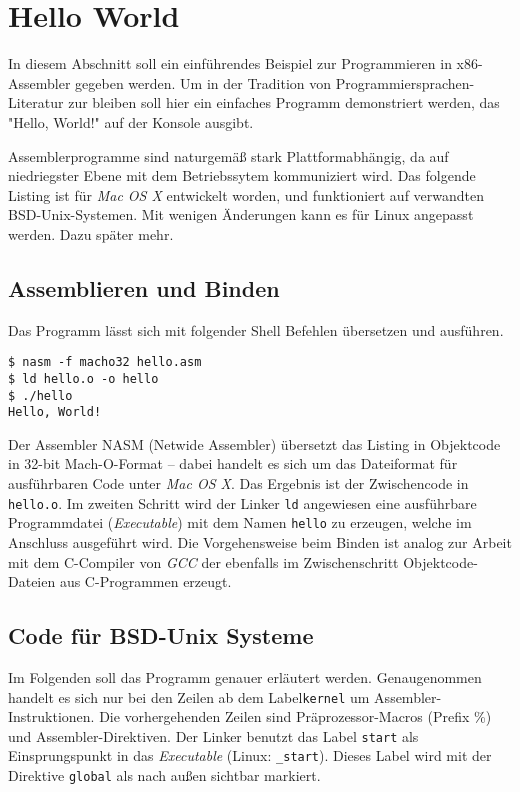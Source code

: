 \section{Hello World}

In diesem Abschnitt soll ein einführendes Beispiel zur Programmieren in x86-Assembler gegeben werden. Um in der Tradition von Programmiersprachen-Literatur zur bleiben soll hier ein einfaches Programm demonstriert werden, das "Hello, World!" auf der Konsole ausgibt.

Assemblerprogramme sind naturgemäß stark Plattformabhängig, da auf niedriegster Ebene mit dem Betriebssytem kommuniziert wird.
Das folgende Listing ist für \emph{Mac OS X} entwickelt worden, und 
funktioniert auf verwandten BSD-Unix-Systemen. Mit wenigen Änderungen kann es für Linux angepasst werden. Dazu später mehr.

\subsection{Assemblieren und Binden}

Das Programm lässt sich mit folgender Shell Befehlen übersetzen und ausführen.

\begin{lstlisting}[caption=Assemblieren und Binden von hello.asm]
$ nasm -f macho32 hello.asm
$ ld hello.o -o hello
$ ./hello
Hello, World!
\end{lstlisting}

Der Assembler NASM (Netwide Assembler) übersetzt das Listing in Objektcode in 32-bit Mach-O-Format – dabei handelt es sich um das Dateiformat für ausführbaren Code unter \emph{Mac OS X}. Das Ergebnis ist der Zwischencode in \texttt{hello.o}. Im zweiten Schritt wird der Linker \texttt{ld} angewiesen eine ausführbare Programmdatei (\emph{Executable}) mit dem Namen \texttt{hello} zu erzeugen, welche im Anschluss ausgeführt wird. Die Vorgehensweise beim Binden ist analog zur Arbeit mit dem C-Compiler von \emph{GCC} der ebenfalls im Zwischenschritt Objektcode-Dateien aus C-Programmen erzeugt.

\subsection{Code für BSD-Unix Systeme}

Im Folgenden soll das Programm genauer erläutert werden. Genaugenommen handelt es sich nur bei den Zeilen ab dem Label\texttt{kernel} um Assembler-Instruktionen. Die vorhergehenden Zeilen sind Präprozessor-Macros (Prefix \%) und Assembler-Direktiven. Der Linker benutzt das Label {\tt start} als Einsprungspunkt in das \emph{Executable} (Linux: {\tt \_start}).
Dieses Label wird mit der Direktive {\tt global} als nach außen sichtbar markiert.

